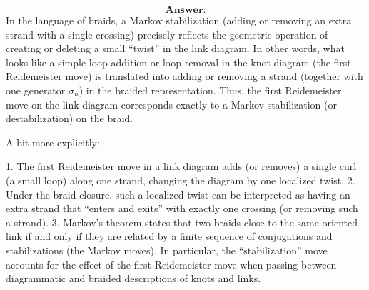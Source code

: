 \documentclass[12p]{article}
\newcounter{answercounter}
\newenvironment{answer}[1][]
{\refstepcounter{answercounter}%
\begin{tcolorbox}[
    title=Answer \theanswercounter: #1,
    colback=white, %
    colframe=gray,
    coltext=black, %
    fonttitle=\bfseries\normalsize,
    top=2mm,
    bottom=2mm,
    enlarge top initially by=5mm
]
\small
}
{\end{tcolorbox}}
\begin{document}
\begin{answer}[by openai/o1 (generated in 0 minutes and 32 seconds.)]
\[
\textbf{Answer:}
\]
In the language of braids, a Markov stabilization (adding or removing an extra strand with a single crossing) precisely reflects the geometric operation of creating or deleting a small “twist” in the link diagram.  In other words, what looks like a simple loop‐addition or loop‐removal in the knot diagram (the first Reidemeister move) is translated into adding or removing a strand (together with one generator \(\sigma_n\)) in the braided representation.  Thus, the first Reidemeister move on the link diagram corresponds exactly to a Markov stabilization (or destabilization) on the braid. 

A bit more explicitly:

1. The first Reidemeister move in a link diagram adds (or removes) a single curl (a small loop) along one strand, changing the diagram by one localized twist.
2. Under the braid closure, such a localized twist can be interpreted as having an extra strand that “enters and exits” with exactly one crossing (or removing such a strand).  
3. Markov’s theorem states that two braids close to the same oriented link if and only if they are related by a finite sequence of conjugations and stabilizations (the Markov moves).  In particular, the “stabilization” move accounts for the effect of the first Reidemeister move when passing between diagrammatic and braided descriptions of knots and links.
\end{answer}
\end{document}
